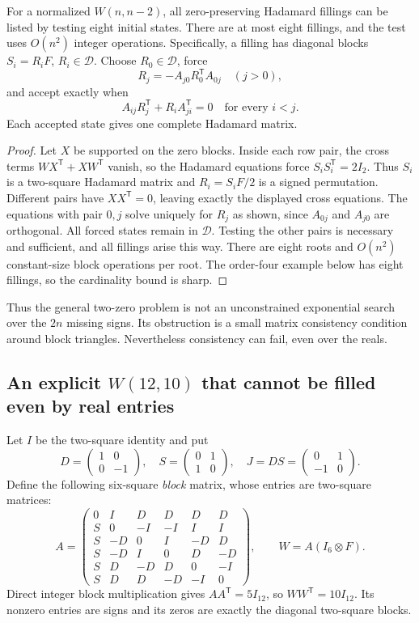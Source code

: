 \begin{theorem}
For a normalized $W(n,n-2)$, all zero-preserving Hadamard fillings
can be listed by testing eight initial states. There are at most
eight fillings, and the test uses $O(n^2)$ integer operations.
Specifically, a filling has diagonal blocks $S_i=R_iF$,
$R_i\in\mathcal D$. Choose $R_0\in\mathcal D$, force
\[
 R_j=-A_{j0}R_0^{\mathsf T}A_{0j}\quad(j>0),
\]
and accept exactly when
\[
 A_{ij}R_j^{\mathsf T}+R_iA_{ji}^{\mathsf T}=0
 \quad\text{for every }i<j.
\]
Each accepted state gives one complete Hadamard matrix.
\end{theorem}
\begin{proof}
Let $X$ be supported on the zero blocks. Inside each row pair,
the cross terms $WX^{\mathsf T}+XW^{\mathsf T}$ vanish, so the
Hadamard equations force $S_iS_i^{\mathsf T}=2I_2$. Thus $S_i$
is a two-square Hadamard matrix and $R_i=S_iF/2$ is a signed
permutation. Different pairs have $XX^{\mathsf T}=0$, leaving
exactly the displayed cross equations. The equations with pair
$0,j$ solve uniquely for $R_j$ as shown, since $A_{0j}$ and
$A_{j0}$ are orthogonal. All forced states remain in $\mathcal D$.
Testing the other pairs is necessary and sufficient, and all
fillings arise this way. There are eight roots and $O(n^2)$
constant-size block operations per root. The order-four example
below has eight fillings, so the cardinality bound is sharp.
\end{proof}

Thus the general two-zero problem is not an unconstrained
exponential search over the $2n$ missing signs. Its obstruction
is a small matrix consistency condition around block triangles.
Nevertheless consistency can fail, even over the reals.

\subsection{An explicit $W(12,10)$ that cannot be filled even by real entries}
Let $I$ be the two-square identity and put
\[
 D=\begin{pmatrix}1&0\\0&-1\end{pmatrix},\quad
 S=\begin{pmatrix}0&1\\1&0\end{pmatrix},\quad
 J=DS=\begin{pmatrix}0&1\\-1&0\end{pmatrix}.
\]
Define the following six-square \emph{block} matrix, whose entries
are two-square matrices:
\[
 A=\begin{pmatrix}
0&I&D&D&D&D\\
S&0&-I&-I&I&I\\
S&-D&0&I&-D&D\\
S&-D&I&0&D&-D\\
S&D&-D&D&0&-I\\
S&D&D&-D&-I&0
\end{pmatrix},\qquad W=A(I_6\otimes F).
\]
Direct integer block multiplication gives $AA^{\mathsf T}=5I_{12}$,
so $WW^{\mathsf T}=10I_{12}$. Its nonzero entries are signs and
its zeros are exactly the diagonal two-square blocks.

